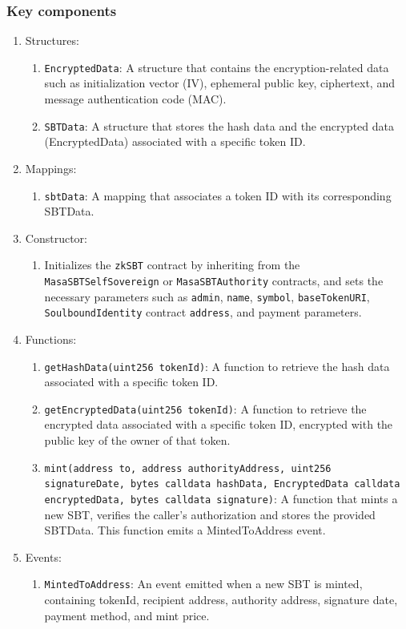 \documentclass{article}
\begin{document}
\subsubsection{Key components}
\begin{enumerate}
    \item Structures:
    \begin{enumerate}[label*=\arabic*.]
      \item \texttt{EncryptedData}: A structure that contains the encryption-related data such as initialization vector (IV), ephemeral public key, ciphertext, and message authentication code (MAC).
      \item \texttt{SBTData}: A structure that stores the hash data and the encrypted data (EncryptedData) associated with a specific token ID.
    \end{enumerate}
    \item Mappings:
    \begin{enumerate}[label*=\arabic*.]
      \item \texttt{sbtData}: A mapping that associates a token ID with its corresponding SBTData.
    \end{enumerate}
    \item Constructor:
    \begin{enumerate}[label*=\arabic*.]
      \item Initializes the \texttt{zkSBT} contract by inheriting from the \texttt{MasaSBTSelfSovereign} or \texttt{MasaSBTAuthority} contracts, and sets the necessary parameters such as \texttt{admin}, \texttt{name}, \texttt{symbol}, \texttt{baseTokenURI}, \texttt{SoulboundIdentity} contract \texttt{address}, and payment parameters.
    \end{enumerate}
    \item Functions:
    \begin{enumerate}[label*=\arabic*.]
      \item \texttt{getHashData(uint256 tokenId)}: A function to retrieve the hash data associated with a specific token ID.
      \item \texttt{getEncryptedData(uint256 tokenId)}: A function to retrieve the encrypted data associated with a specific token ID, encrypted with the public key of the owner of that token.
      \item \texttt{mint(address to, address authorityAddress, uint256 signatureDate, bytes calldata hashData, EncryptedData calldata encryptedData, bytes calldata signature)}: A function that mints a new SBT, verifies the caller's authorization and stores the provided SBTData. This function emits a MintedToAddress event.
    \end{enumerate}
    \item Events:
    \begin{enumerate}[label*=\arabic*.]
      \item \texttt{MintedToAddress}: An event emitted when a new SBT is minted, containing tokenId, recipient address, authority address, signature date, payment method, and mint price.
    \end{enumerate}
  \end{enumerate}
\end{document}
